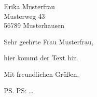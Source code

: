\documentclass{HUBerlin-letter}
\begin{document}
\begin{letter}{%
  Erika Musterfrau\\
  Musterweg 43\\
  56789 Musterhausen%
}

\opening{Sehr geehrte Frau Musterfrau,}

hier kommt der Text hin.

\closing{Mit freundlichen Grüßen,}

\ps PS: \dots



\end{letter}
\end{document}
